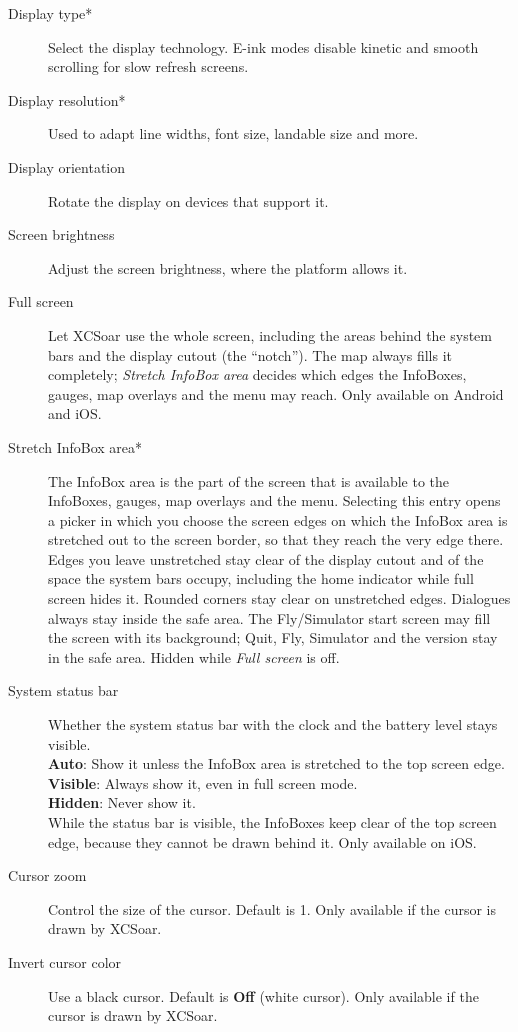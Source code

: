 \begin{description}
\item[Display type*]  Select the display technology. E-ink modes disable
  kinetic and smooth scrolling for slow refresh screens.
\item[Display resolution*]  Used to adapt line widths, font size, landable
  size and more.
\item[Display orientation]  Rotate the display on devices that support it.
\item[Screen brightness]  Adjust the screen brightness, where the platform
  allows it.
\item[Full screen]  Let XCSoar use the whole screen, including the areas
  behind the system bars and the display cutout (the ``notch''). The map
  always fills it completely; \emph{Stretch InfoBox area} decides which
  edges
  the InfoBoxes, gauges, map overlays and the menu may reach.
  Only available on Android and iOS.
\item[Stretch InfoBox area*]  The InfoBox area is the part of the screen
  that is available to the InfoBoxes, gauges, map overlays and the
  menu. Selecting
  this entry opens a picker in which you choose the screen edges on which
  the InfoBox area is stretched out to the screen border, so that they
  reach the very edge
  there. Edges you leave unstretched stay clear of the display
  cutout and of the space the system bars occupy, including the
  home indicator while full screen hides it. Rounded corners stay
  clear on unstretched edges. Dialogues always stay inside the
  safe area. The Fly/Simulator start screen may fill the screen
  with its background; Quit, Fly, Simulator and the version stay
  in the safe area.
  Hidden while \emph{Full screen} is off.
\item[System status bar]  Whether the system status bar with the clock and
  the battery level stays visible. \\
  {\bf Auto}: Show it unless the InfoBox area is stretched to the top
  screen edge. \\
  {\bf Visible}: Always show it, even in full screen mode. \\
  {\bf Hidden}: Never show it. \\
  While the status bar is visible, the InfoBoxes keep clear of the top screen
  edge, because they cannot be drawn behind it.
  Only available on iOS.
\item[Cursor zoom]  Control the size of the cursor. Default is 1.
  Only available if the cursor is drawn by XCSoar.
\item[Invert cursor color]  Use a black cursor. Default is {\bf Off}
  (white cursor). Only available if the cursor is drawn by XCSoar.
\end{description}


